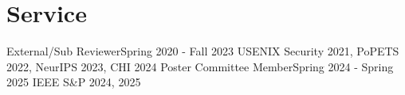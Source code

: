\section{Service}
\CVSubHeadingListStart
    \CVSubheading
      {External/Sub Reviewer}{Spring 2020 - Fall 2023}
      {USENIX Security 2021, PoPETS 2022, NeurIPS 2023, CHI 2024}{}
    \CVSubheading
    {Poster Committee Member}{Spring 2024 - Spring 2025}
      {IEEE S\&P 2024, 2025}{}
  \CVSubHeadingListEnd